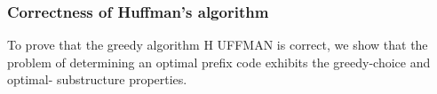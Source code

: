 \subsubsection*{Correctness of Huffman's algorithm}

    To prove that the greedy algorithm H UFFMAN is correct, we show that the problem
    of determining an optimal preﬁx code exhibits the greedy-choice and optimal-
    substructure properties.

    





























